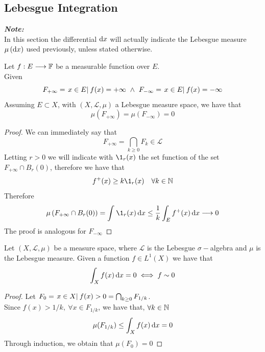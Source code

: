 \documentclass[../complete.tex]{subfiles}
\begin{document}
\subsection{Lebesgue Integration}
\textit{\textbf{Note:}}\\
In this section the differential $\operatorname{d\!} x$ will actually indicate the Lebesgue measure $\mu\left( \operatorname{d\!} x \right)$ used previously, unless stated otherwise.
\begin{thm}
	Let $f:E\overset{}{\longrightarrow}\mathbb{F}$ be a measurable function over $E$.\\
	Given
	\begin{equation*}
		F_{+\infty}={\left.x\in E\right|_{}f(x)=+\infty}\ \wedge\ F_{-\infty}={\left.x\in E\right|_{}f(x)=-\infty}
	\end{equation*}
	Assuming $E\subset X$, with $(X,\mathcal{L},\mu)$ a Lebesgue measure space, we have that
	\begin{equation*}
		\mu\left( F_{+\infty} \right)=\mu\left( F_{-\infty} \right)=0
	\end{equation*}
\end{thm}
\begin{proof}
	We can immediately say that
	\begin{equation*}
		F_{+\infty}=\bigcap_{k\ge0}F_k\in\mathcal{L}
	\end{equation*}
	Letting $r>0$ we will indicate with $\1_r(x)$ the set function of the set $F_{+\infty}\cap B_r(0)$, therefore we have that
	\begin{equation*}
		f^+(x)\ge k\1_r(x)\quad\forall k\in\N
	\end{equation*}
	Therefore
	\begin{equation*}
		\mu\left( F_{+\infty}\cap B_r(0) \right)=\int_{}^{}\1_r(x)\diff x\le\frac{1}{k}\int_{E}f^+(x)\diff x\fto0
	\end{equation*}
	The proof is analogous for $F_{-\infty}$
\end{proof}
\begin{thm}
	Let $(X,\mathcal{L},\mu)$ be a measure space, where $\mathcal{L}$ is the Lebesgue $\sigma-$algebra and $\mu$ is the Lebesgue measure. Given a function $f\in L^1(X)$ we have that
	\begin{equation}
		\int_{X}f(x)\operatorname{d\!} x=0\iff{} f\sim 0
		\label{eq:nullintegral}
	\end{equation}
\end{thm}
\begin{proof}
	Let $F_0={\left.x\in X\right|_{}f(x)>0}=\bigcap_{k\ge0}F_{1/k}$.\\
	Since $f(x)>1/k,\ \forall x\in F_{1/k}$, we have that, $\forall k\in\mathbb{N}$
	\begin{equation*}
		\mu(F_{1/k})\le\int_{X}^{}f(x)\operatorname{d\!} x=0
	\end{equation*}
	Through induction, we obtain that $\mu(F_0)=0$
\end{proof}
\end{document}
